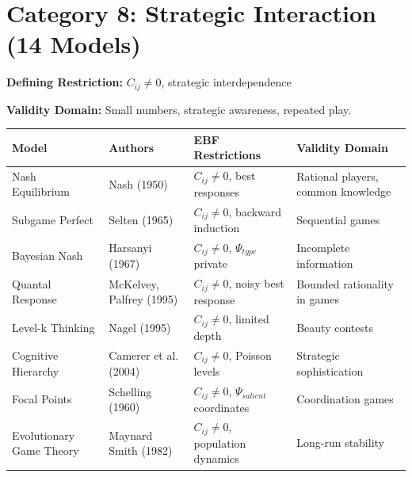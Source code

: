 \section{Category 8: Strategic Interaction (14 Models)}
\label{sec:ms-games}

\begin{tcolorbox}[colback=gray!5!white, colframe=gray!75!black,
    title=\textbf{Strategic Interaction: The Multiple Equilibria Extension}]

\textbf{Defining Restriction:} $C_{ij} \neq 0$, strategic interdependence

\textbf{Validity Domain:} Small numbers, strategic awareness, repeated play.

\end{tcolorbox}

\small
\begin{longtable}{@{}p{3cm}p{2.5cm}p{4cm}p{4cm}@{}}
\toprule
\textbf{Model} & \textbf{Authors} & \textbf{EBF Restrictions} & \textbf{Validity Domain} \\
\midrule
\endhead

Nash Equilibrium & Nash (1950) &
$C_{ij} \neq 0$, best responses &
Rational players, common knowledge \\

Subgame Perfect & Selten (1965) &
$C_{ij} \neq 0$, backward induction &
Sequential games \\

Bayesian Nash & Harsanyi (1967) &
$C_{ij} \neq 0$, $\Psi_{type}$ private &
Incomplete information \\

Quantal Response & McKelvey, Palfrey (1995) &
$C_{ij} \neq 0$, noisy best response &
Bounded rationality in games \\

Level-k Thinking & Nagel (1995) &
$C_{ij} \neq 0$, limited depth &
Beauty contests \\

Cognitive Hierarchy & Camerer et al. (2004) &
$C_{ij} \neq 0$, Poisson levels &
Strategic sophistication \\

Focal Points & Schelling (1960) &
$C_{ij} \neq 0$, $\Psi_{salient}$ coordinates &
Coordination games \\

Evolutionary Game Theory & Maynard Smith (1982) &
$C_{ij} \neq 0$, population dynamics &
Long-run stability \\


\end{longtable}
